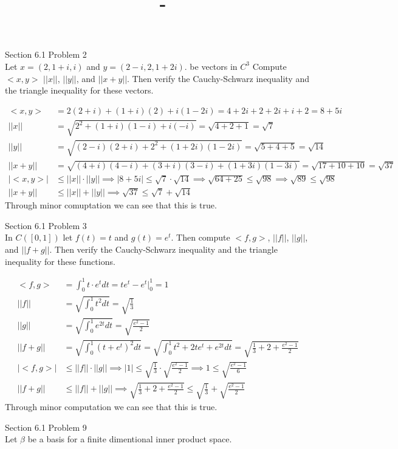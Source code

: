 \documentclass[answers,12pt,addpoints]{exam}
\author{\name}
\title{\course \ - \assignment}
\begin{document}
\maketitle


\newpage
\begin{questions}
    \question Section 6.1 Problem 2\\
    Let $x=(2,1+i,i)$ and $y=(2-i, 2, 1+2i)$. be vectors in $C^3$ Compute $<x,y>$ $||x||$, $||y||$, and $||x+y||$. Then verify the Cauchy-Schwarz inequality and the triangle inequality for these vectors.
    \begin{solution}
        \begin{align*}
            <x,y> &= 2(2+i) + (1+i)(2) + i(1-2i) = 4 + 2i + 2 + 2i + i + 2 = 8 + 5i\\
            ||x|| &= \sqrt{2^2 +(1+i)(1-i) + i(-i)} = \sqrt{4 + 2 + 1} = \sqrt{7}\\
            ||y|| &= \sqrt{(2-i)(2+i) + 2^2 + (1+2i)(1-2i)} = \sqrt{5 + 4 + 5} = \sqrt{14}\\
            ||x+y|| &= \sqrt{(4+i)(4-i) + (3+i)(3-i) + (1+3i)(1-3i)} = \sqrt{17 + 10 + 10} = \sqrt{37}\\
            |<x,y>| &\leq ||x|| \cdot ||y|| \implies |8 + 5i| \leq \sqrt{7} \cdot \sqrt{14} \implies \sqrt{64 + 25} \leq \sqrt{98} \implies \sqrt{89} \leq \sqrt{98}\\
            ||x+y|| &\leq ||x|| + ||y|| \implies \sqrt{37} \leq \sqrt{7} + \sqrt{14}
        \end{align*}        
        Through minor comuptation we can see that this is true.
    \end{solution}
    \question Section 6.1 Problem 3\\
    In $C([0,1])$ let $f(t) = t$ and $g(t) = e^t$. Then compute $<f,g>$, $||f||$, $||g||$, and $||f+g||$. Then verify the Cauchy-Schwarz inequality and the triangle inequality for these functions.
    \begin{solution}
        \begin{align*}
            <f,g> &= \int_{0}^{1} t \cdot e^t dt = te^t - e^t \Big|_{0}^{1} = 1\\
            ||f|| &= \sqrt{\int_{0}^{1} t^2 dt} = \sqrt{\frac{1}{3}}\\
            ||g|| &= \sqrt{\int_{0}^{1} e^{2t} dt} = \sqrt{\frac{e^2 - 1}{2}}\\
            ||f+g|| &= \sqrt{\int_{0}^{1} (t+e^t)^2 dt} = \sqrt{\int_{0}^{1} t^2 + 2te^t + e^{2t} dt} = \sqrt{\frac{1}{3} + 2 + \frac{e^2 - 1}{2}}\\
            |<f,g>| &\leq ||f|| \cdot ||g|| \implies |1| \leq \sqrt{\frac{1}{3}} \cdot \sqrt{\frac{e^2 - 1}{2}} \implies 1 \leq \sqrt{\frac{e^2 - 1}{6}}\\
            ||f+g|| &\leq ||f|| + ||g|| \implies \sqrt{\frac{1}{3} + 2 + \frac{e^2 - 1}{2}} \leq \sqrt{\frac{1}{3}} + \sqrt{\frac{e^2 - 1}{2}}
        \end{align*}
        Through minor computation we can see that this is true.
    \end{solution}
    \question Section 6.1 Problem 9\\
    Let $\beta$ be a basis for a finite dimentional inner product space.
    \begin{parts}

\end{parts}
\end{questions}
\end{document}
